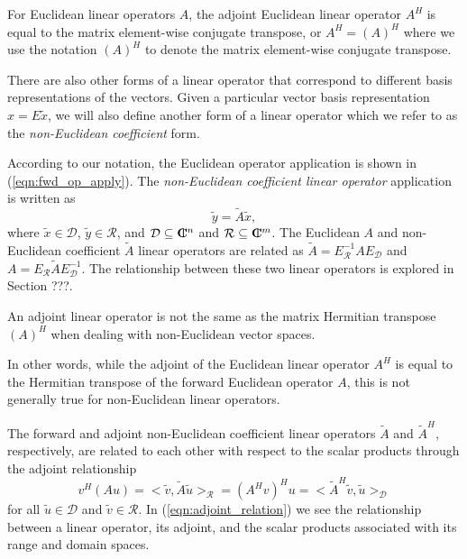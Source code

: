 For Euclidean linear operators $A$, the adjoint Euclidean linear operator
$A^H$ is equal to the matrix element-wise conjugate transpose, or $A^H =
(A)^H$ where we use the notation $(A)^H$ to denote the matrix element-wise
conjugate transpose.

There are also other forms of a linear operator that correspond to different
basis representations of the vectors.  Given a particular vector basis
representation $x = E {}\tilde{x}$, we will also define another form of a
linear operator which we refer to as the {}\textit{non-Euclidean coefficient}
form.

According to our notation, the Euclidean operator application is shown in
(\ref{eqn:fwd_op_apply}).  The {}\textit{non-Euclidean coefficient linear
operator} application is written as
%
\begin{equation}
\tilde{y} = \tilde{A} \tilde{x},
\label{eqn:fwd_op_apply_euclidean}
\end{equation}
%
where $\tilde{x}\in\mathcal{D}$, $\tilde{y}\in\mathcal{R}$, and
$\mathcal{D}\subseteq\mbox{\textbf{C}}\hspace{-1.1ex}\mbox{l}\hspace{0.4ex}^n$ and $\mathcal{R}\subseteq\mbox{\textbf{C}}\hspace{-1.1ex}\mbox{l}\hspace{0.4ex}^m$.  The
Euclidean $A$ and non-Euclidean coefficient $\tilde{A}$ linear operators are
related as $\tilde{A} = E_{\mathcal{R}}^{-1} A E_{\mathcal{D}}$ and $A =
E_{\mathcal{R}} {}\tilde{A} E_{\mathcal{D}}^{-1}$.  The relationship between
these two linear operators is explored in Section ???.

{}\begin{dumb_fact} An adjoint linear operator is not the same as the matrix
Hermitian transpose $(A)^H$ when dealing with non-Euclidean vector spaces.
{}\end{dumb_fact}

In other words, while the adjoint of the Euclidean linear operator $A^H$ is
equal to the Hermitian transpose of the forward Euclidean operator $A$, this is
not generally true for non-Euclidean linear operators.

The forward and adjoint non-Euclidean coefficient linear operators
$\tilde{A}$ and $\tilde{A}^H$, respectively, are related to each other with
respect to the scalar products through the adjoint relationship
%
\begin{equation}
v^H (A u)
= <\tilde{v},\tilde{A} \tilde{u}>_{\mathcal{R}}
= (A^H v)^H u
= <\tilde{A}^H \tilde{v},\tilde{u}>_{\mathcal{D}}
\label{eqn:adjoint_relation}
\end{equation}
%
for all $\tilde{u}\in\mathcal{D}$ and $\tilde{v}\in\mathcal{R}$.  In
(\ref{eqn:adjoint_relation}) we see the relationship between a linear
operator, its adjoint, and the scalar products associated with its range and
domain spaces.

